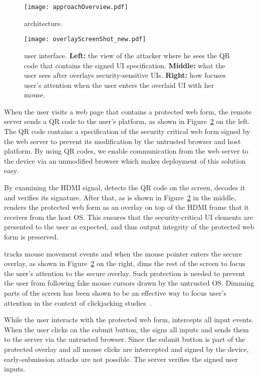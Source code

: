 \begin{figure}[t]
	\centering
	\texttt{[image: approachOverview.pdf]}
	\caption{\protection architecture.}
	\label{fig:architecture}
\end{figure}

\begin{figure}[t]
	\centering
	\texttt{[image: overlayScreenShot\_new.pdf]}
	\caption{\protection user interface. \textbf{Left:} the view of the attacker where he sees the QR code that contains the signed UI specification. \textbf{Middle:} what the user sees after \hub overlays security-sensitive UIs. \textbf{Right:} how \protection focuses user's attention when the user enters the overlaid UI with her mouse.}
	\label{fig:screenshot}
\end{figure}

When the user visits a web page that contains a protected web form, the remote server sends a QR code to the user's platform, as shown in Figure~\ref{fig:screenshot} on the left. The QR code contains a specification of the security critical web form signed by the web server to prevent its modification by the untrusted browser and host platform. By using QR codes, we enable communication from the web server to the \hub device via an unmodified browser which makes deployment of this solution easy.

By examining the HDMI signal, \hub detects the QR code on the screen, decodes it and verifies its signature. After that, as is shown in Figure~\ref{fig:screenshot} in the middle, \hub renders the protected web form as an overlay on top of the HDMI frame that it receives from the host OS. This ensures that the security-critical UI elements are presented to the user as expected, and thus output integrity of the protected web form is preserved.

\hub tracks mouse movement events and when the mouse pointer enters the secure overlay, as shown in Figure~\ref{fig:screenshot} on the right, \hub dims the rest of the screen to focus the user's attention to the secure overlay. Such protection is needed to prevent the user from following fake mouse cursors drawn by the untrusted OS. Dimming parts of the screen has been shown to be an effective way to focus user's attention in the context of clickjacking studies~\cite{huang2012clickjacking}.

While the user interacts with the protected web form, \hub intercepts all input events. When the user clicks on the submit button, the \hub signs all inputs and sends them to the server via the untrusted browser. Since the submit button is part of the protected overlay and all mouse clicks are intercepted and signed by the \hub device, early-submission attacks are not possible. The server verifies the signed user inputs. 

